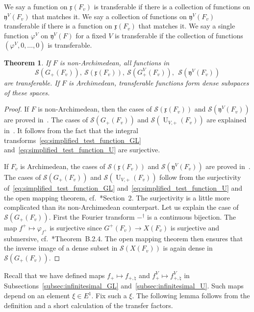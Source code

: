\documentclass[letterpaper,11pt]{amsart}
\newcommand{\fx}{\mathfrak{x}}
\newcommand{\fy}{\mathfrak{y}}
\newcommand{\cS}{\mathcal{S}}
\newcommand{\<}{\negthickspace}
\DeclareMathOperator{\U}{U}
\theoremstyle{definition}
\theoremstyle{plain}
\newtheorem{theorem}[definition]{Theorem}
\theoremstyle{remark}
\numberwithin{equation}{section}
\begin{document}
We say a function on $\fx(F_v)$ is transferable if there is a collection of
functions on $\fy^V(F_v)$ that matches it. We say a collection of functions
on $\fy^V(F_v)$ transferable if there is a function on $\fx(F_v)$ that
matches it. We say a single function $\varphi^V$ on $\fy^V(F)$ for a fixed
$V$ is transferable if the collection of functions $(\varphi^V, 0, \hdots,
0)$ is transferable.




\begin{theorem} \label{thm:matching}
If $F$ is non-Archimedean, all functions in
    \[
    \cS(G_+(F_v)), \ \cS(\fx(F_v)),
    \ \cS(G_+^V(F_v)),\
    \ \cS(\fy^V(F_v))
    \]
are transferable. If $F$ is Archimedean, transferable functions form dense
subspaces of these spaces.
\end{theorem}

\begin{proof}
If $F$ is non-Archimedean, then the cases of $\cS(\fx(F_v))$ and
$\cS(\fy^V(F_v))$ are proved in~\cite{Zhang1}. The cases of $\cS(G_+(F_v))$
and $\cS(\U_{V,+}(F_v))$ are explained in~\cite{Xue1}. It follows from the
fact that the integral transforms~\eqref{eq:simplified_test_function_GL}
and~\eqref{eq:simplified_test_function_U} are surjective.

If $F_v$ is Archimedean, the cases of $\cS(\fx(F_v))$ and $\cS(\fy^V(F_v))$
are proved in~\cite{Xue3}. The cases of $\cS(G_+(F_v))$ and
$\cS(\U_{V,+}(F_v))$ follow from the surjectivity
of~\eqref{eq:simplified_test_function_GL}
and~\eqref{eq:simplified_test_function_U} and the open mapping theorem,
cf.~\cite{Xue3}*{Section~2}. The surjectivity is a little more complicated
than its non-Archimedean counterpart. Let us explain the case of
$\cS(G_+(F_v))$. First the Fourier transform $-^\dag$ is a continuous
bijection. The map $f^+ \mapsto \varphi_{f^+}$ is surjective since $G^+(F_v)
\to X(F_v)$ is surjective and submersive, cf.~\cite{AG}*{Theorem~B.2.4}.
The open mapping theorem then ensures that the inverse image of a dense
subset in $\cS(X(F_v))$ is again dense in $\cS(G_+(F_v))$.
\end{proof}

Recall that we have defined maps $f_+ \mapsto f_{+, \natural}$ and $f_+^V
\mapsto f^V_{+, \natural}$ in Subsections~\ref{subsec:infinitesimal_GL}
and~\ref{subsec:infinitesimal_U}. Such maps depend on an element $\xi \in
E^1$. Fix such a $\xi$. The
following lemma follows from the definition and a short calculation of the
transfer factors.
\end{document}
